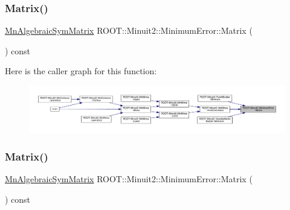 \mbox{\label{classROOT_1_1Minuit2_1_1MinimumError_a7065d453e2892ed1c25b7f28d0c1aa66}} 
\subsubsection{\texorpdfstring{Matrix()}{Matrix()}\hspace{0.1cm}{\footnotesize\ttfamily [1/3]}}
{\footnotesize\ttfamily \mbox{\hyperlink{namespaceROOT_1_1Minuit2_a9e74ad97f5537a2e80e52b04d98ecc6e}{Mn\+Algebraic\+Sym\+Matrix}} R\+O\+O\+T\+::\+Minuit2\+::\+Minimum\+Error\+::\+Matrix (\begin{DoxyParamCaption}{ }\end{DoxyParamCaption}) const\hspace{0.3cm}{\ttfamily [inline]}}

Here is the caller graph for this function\+:
\nopagebreak
\begin{figure}[H]
\begin{center}
\leavevmode
\includegraphics[width=350pt]{d5/d32/classROOT_1_1Minuit2_1_1MinimumError_a7065d453e2892ed1c25b7f28d0c1aa66_icgraph}
\end{center}
\end{figure}
\mbox{\label{classROOT_1_1Minuit2_1_1MinimumError_a7065d453e2892ed1c25b7f28d0c1aa66}} 
\subsubsection{\texorpdfstring{Matrix()}{Matrix()}\hspace{0.1cm}{\footnotesize\ttfamily [2/3]}}
{\footnotesize\ttfamily \mbox{\hyperlink{namespaceROOT_1_1Minuit2_a9e74ad97f5537a2e80e52b04d98ecc6e}{Mn\+Algebraic\+Sym\+Matrix}} R\+O\+O\+T\+::\+Minuit2\+::\+Minimum\+Error\+::\+Matrix (\begin{DoxyParamCaption}{ }\end{DoxyParamCaption}) const\hspace{0.3cm}{\ttfamily [inline]}}

